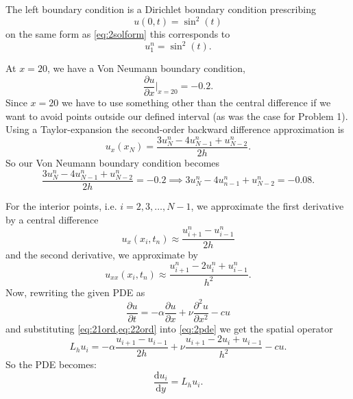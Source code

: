 \begin{derivation}
    The left boundary condition is a Dirichlet boundary condition prescribing
    \begin{equation}
      u(0,t) = \sin^2(t)
    \end{equation}
    on the same form as \cref{eq:2solform} this corresponds to
    \begin{equation*}
      u_1^{n} = \sin^2 (t)
    .\end{equation*}

    At $x = 20$, we have a Von Neumann boundary condition,
    \begin{equation}
      \frac{\partial u}{\partial x} \bigg|_{x = 20} = -\num{0,2} 
    .\end{equation}
    Since $x = 20$ we have to use something other than the central difference if we want to avoid points outside our defined interval (as was the case for Problem 1). 
    Using a Taylor-expansion the second-order backward difference approximation is
    \begin{equation*}
      u_x(x_N) = \frac{3u_N^{n} - 4 u_{N-1}^{n} + u_{N-2}^{n}}{2h}
    .\end{equation*}
    So our Von Neumann boundary condition becomes
    \begin{equation*}
      \frac{3u_N^{n} - 4u_{N-1}^{n} + u_{N-2}^{n}}{2h} = \num{-0,2} \implies 3u_N^{n} - 4u_{n-1}^{n} + u_{N-2}^{n} = \num{-0,08}
    .\end{equation*}
    
    For the interior points, i.e. $i = 2, 3, \ldots , N-1$, we approximate the first derivative by a central difference
    \begin{equation} \label{eq:21ord}
      u_x(x_i, t_n) \approx \frac{u_{i+1}^{n} - u_{i-1}^{n}}{2h}
    \end{equation}
    and the second derivative, we approximate by
    \begin{equation} \label{eq:22ord}
      u_{x x }(x_i, t_n) \approx \frac{u_{i+1}^{n} - 2u_{i}^{n} + u_{i-1}^{n}}{h^2}
    .\end{equation}
    Now, rewriting the given PDE as
    \begin{equation} \label{eq:2pde}
      \frac{\partial u}{\partial t} =- \alpha \frac{\partial u}{\partial x} + \nu \frac{\partial ^2 u}{\partial x^2} - cu
    \end{equation}
    and substituting \cref{eq:21ord,eq:22ord} into \cref{eq:2pde} we get the spatial operator
    \begin{equation*}
      L_h u_i = - \alpha \frac{u_{i+1} - u_{i-1}}{2h} + \nu \frac{u_{i+1} - 2u_i + u_{i-1}}{h^2} - cu
    .\end{equation*}
    So the PDE becomes:
    \begin{equation*}
      \frac{\mathrm{d}u_i}{\mathrm{d}y} = L_h u_i
    .\end{equation*}
    

\end{derivation}
